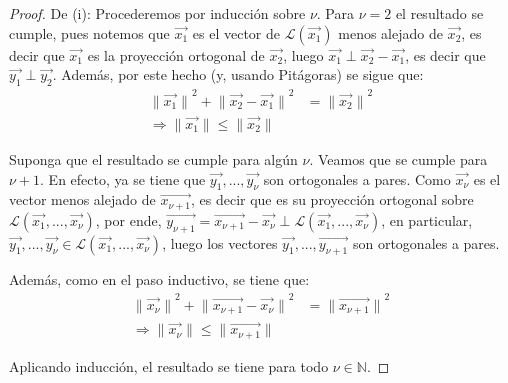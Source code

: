 \documentclass[12pt]{report}
\newcounter{it}
\theoremstyle{largebreak}
\newcommand\norm[1]{\ensuremath{\|#1\|}}
\begin{document}
    \begin{proof}
        De (i): Procederemos por inducción sobre $\nu$. Para $\nu=2$ el resultado se cumple, pues notemos que $\vec{x_1}$ es el vector de $\mathcal{L}(\vec{x_1})$ menos alejado de $\vec{x_{2}}$, es decir que $\vec{x_1}$ es la proyección ortogonal de $\vec{x_2}$, luego $\vec{x_1}\perp \vec{x_2}-\vec{x_1}$, es decir que $\vec{y_1}\perp\vec{y_2}$. Además, por este hecho (y, usando Pitágoras) se sigue que:
        \begin{equation*}
            \begin{split}
                \norm{\vec{x_1}}^2+\norm{\vec{x_2}-\vec{x_1}}^2&=\norm{\vec{x_2}}^2\\
                \Rightarrow \norm{\vec{x_1}}\leq\norm{\vec{x_2}}
            \end{split}
        \end{equation*}

        Suponga que el resultado se cumple para algún $\nu$. Veamos que se cumple para $\nu+1$. En efecto, ya se tiene que $\vec{y_1},...,\vec{y_\nu}$ son ortogonales a pares. Como $\vec{x_\nu}$ es el vector menos alejado de $\vec{x_{\nu+1}}$, es decir que es su proyección ortogonal sobre $\mathcal{L}(\vec{x_1},...,\vec{x_\nu})$, por ende, $\vec{y_{\nu+1}}=\vec{x_{\nu+1}}-\vec{x_\nu}\perp \mathcal{L}(\vec{x_1},...,\vec{x_\nu})$, en particular, $\vec{y_1},...,\vec{y_\nu}\in\mathcal{L}(\vec{x_1},...,\vec{x_\nu})$, luego los vectores $\vec{y_1},...,\vec{y_{\nu+1}}$ son ortogonales a pares.
        
        Además, como en el paso inductivo, se tiene que:
        \begin{equation*}
            \begin{split}
                \norm{\vec{x_{\nu}}}^2+\norm{\vec{x_{\nu+1}}-\vec{x_{\nu}}}^2&=\norm{\vec{x_{\nu+1}}}^2\\
                    \Rightarrow \norm{\vec{x_{\nu}}}\leq\norm{\vec{x_{\nu+1}}}
            \end{split}
        \end{equation*}
        
        Aplicando inducción, el resultado se tiene para todo $\nu\in\mathbb{N}$.


\end{proof}
\end{document}
